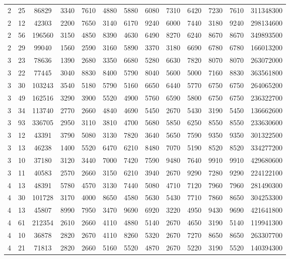 \documentclass[journal]{IEEEtran}
\begin{document}
\begin{table}
\begin{tabular}{|ccc|cccccccc|cc|}
2	&	25	&	86829	&	3340	&	7610	&	4880	&	5880	&	6080	&	7310	&	6420	&	7230	&	7610	&	311348300	\\
2	&	12	&	42303	&	2200	&	7650	&	3140	&	6170	&	9240	&	6000	&	7440	&	3180	&	9240	&	298134600	\\
2	&	56	&	196560	&	3150	&	4850	&	8390	&	4630	&	6490	&	8270	&	6240	&	8670	&	8670	&	349893500	\\
2	&	29	&	99040	&	1560	&	2590	&	3160	&	5890	&	3370	&	3180	&	6690	&	6780	&	6780	&	166013200	\\
\hline
3	&	23	&	78636	&	1390	&	2680	&	3350	&	6680	&	5280	&	6630	&	7820	&	8070	&	8070	&	263072000	\\
3	&	22	&	77445	&	3040	&	8830	&	8400	&	5790	&	8040	&	5600	&	5000	&	7160	&	8830	&	363561800	\\
3	&	30	&	103243	&	3540	&	5180	&	5790	&	5160	&	6650	&	6440	&	5770	&	6750	&	6750	&	264065200	\\
3	&	49	&	162516	&	3290	&	3900	&	5520	&	4900	&	5760	&	6590	&	5800	&	6750	&	6750	&	236322700	\\
3	&	34	&	113740	&	2770	&	2660	&	4840	&	4690	&	5450	&	2670	&	5430	&	3190	&	5450	&	136662600	\\
3	&	93	&	336705	&	2950	&	3110	&	3810	&	4700	&	5680	&	5850	&	6250	&	8550	&	8550	&	233630600	\\
3	&	12	&	43391	&	3790	&	5080	&	3130	&	7820	&	3640	&	5650	&	7590	&	9350	&	9350	&	301322500	\\
3	&	13	&	46238	&	1400	&	5520	&	6470	&	6210	&	8480	&	7070	&	5190	&	8520	&	8520	&	334277200	\\
3	&	10	&	37180	&	3120	&	3440	&	7000	&	7420	&	7590	&	9480	&	7640	&	9910	&	9910	&	429680600	\\
3	&	11	&	40583	&	2570	&	2660	&	3150	&	6210	&	3940	&	2670	&	9290	&	7280	&	9290	&	224122100	\\
\hline
4	&	13	&	48391	&	5780	&	4570	&	3130	&	7440	&	5080	&	4710	&	7120	&	7960	&	7960	&	281490300	\\
4	&	30	&	101728	&	3170	&	4000	&	8650	&	4580	&	5630	&	5430	&	7710	&	7860	&	8650	&	304253300	\\
4	&	13	&	45807	&	8990	&	7950	&	3470	&	9690	&	6920	&	3220	&	4950	&	9430	&	9690	&	421641800	\\
4	&	61	&	212354	&	2610	&	2660	&	4110	&	4880	&	5140	&	2670	&	4650	&	3190	&	5140	&	119941300	\\
4	&	10	&	36878	&	2820	&	2670	&	4110	&	8260	&	5320	&	2670	&	7270	&	8650	&	8650	&	263307700	\\
4	&	21	&	71813	&	2820	&	2660	&	5160	&	5520	&	4870	&	2670	&	5220	&	3190	&	5520	&	140394300	\\

\end{tabular}
\end{table}
\end{document}
